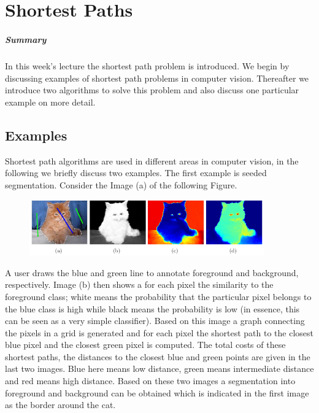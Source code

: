 \chapter{Shortest Paths}%
\label{chap:06}

\paragraph{Summary}
In this week's lecture the shortest path problem is introduced. We begin by
discussing examples of shortest path problems in computer vision. Thereafter we
introduce two algorithms to solve this problem and also discuss one particular
example on more detail.

\section{Examples}
Shortest path algorithms are used in different areas in computer vision, in the
following we briefly discuss two examples. The first example is seeded
segmentation. Consider the Image (a) of the following Figure.

\begin{figure}[H]
  \centering \includegraphics[width=0.9\textwidth]{Figures/cats}
\end{figure}

A user draws the blue and green line to annotate foreground and background,
respectively. Image (b) then shows a for each pixel the similarity to the
foreground class; white means the probability that the particular pixel belongs
to the blue class is high while black means the probability is low (in essence,
this can be seen as a very simple classifier). Based on this image a graph
connecting the pixels in a grid is generated and for each pixel the shortest
path to the closest blue pixel and the closest green pixel is computed. The
total costs of these shortest paths, \ie the distances to the closest blue and
green points are given in the last two images. Blue here means low distance,
green means intermediate distance and red means high distance. Based on these
two images a segmentation into foreground and background can be obtained which
is indicated in the first image as the border around the cat.

